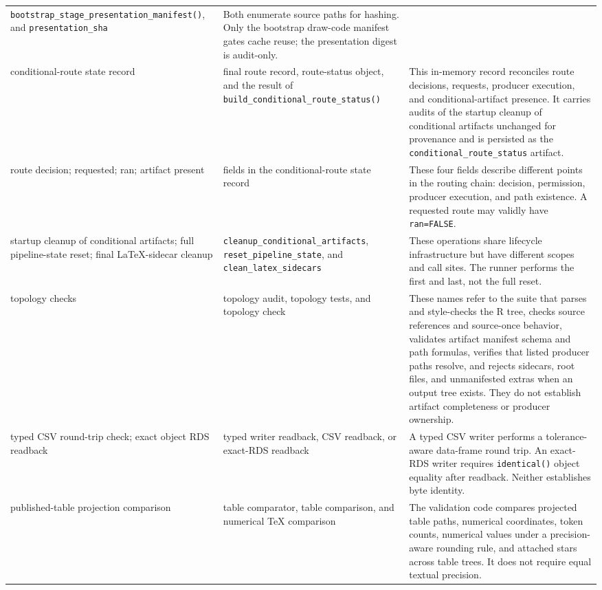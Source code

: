 \documentclass[11pt]{article}
\DeclareRobustCommand{\code}[1]{%
  \ifmmode\text{\ttfamily\detokenize{#1}}\else\nolinkurl{#1}\fi}
\begin{document}
\begin{longtable}{@{}>{\raggedright\arraybackslash}p{}
  >{\raggedright\arraybackslash}p{}
  >{\raggedright\arraybackslash}p{}@{}}
\code{bootstrap_stage_presentation_manifest()}, and \code{presentation_sha} &
Both enumerate source paths for hashing. Only the bootstrap draw-code manifest
gates cache reuse; the presentation digest is audit-only.\\
conditional-route state record & final route record, route-status object, and
the result of \code{build_conditional_route_status()} & This in-memory record
reconciles route decisions, requests, producer execution, and conditional-artifact
presence. It carries audits of the startup cleanup of conditional artifacts
unchanged for provenance and is
persisted as the \code{conditional_route_status} artifact.\\
route decision; requested; ran; artifact present & fields in the
conditional-route state record & These four fields describe different points in
the routing chain: decision, permission, producer execution, and path existence.
A requested route may validly have \code{ran=FALSE}.\\
startup cleanup of conditional artifacts; full pipeline-state reset; final
LaTeX-sidecar cleanup & \code{cleanup_conditional_artifacts},
\code{reset_pipeline_state}, and \code{clean_latex_sidecars} & These operations
share lifecycle infrastructure but have different scopes and call sites. The
runner performs the first and last, not the full reset.\\
topology checks & topology audit, topology tests, and topology check &
These names refer to the suite that parses and style-checks the R tree, checks
source references and source-once behavior, validates artifact manifest schema
and path formulas, verifies that listed producer paths resolve, and rejects
sidecars, root files, and unmanifested extras when an output tree exists. They
do not establish artifact completeness or producer ownership.\\
typed CSV round-trip check; exact object RDS readback & typed writer readback,
CSV readback, or exact-RDS readback & A typed CSV writer performs a
tolerance-aware data-frame round trip. An exact-RDS writer requires
\code{identical()} object equality after readback. Neither establishes byte
identity.\\
published-table projection comparison & table comparator, table comparison, and
numerical TeX comparison & The validation code compares projected table paths,
numerical coordinates, token counts, numerical values under a precision-aware
rounding rule, and attached stars across table trees. It does not require equal
textual precision.\\

\end{longtable}
\end{document}
